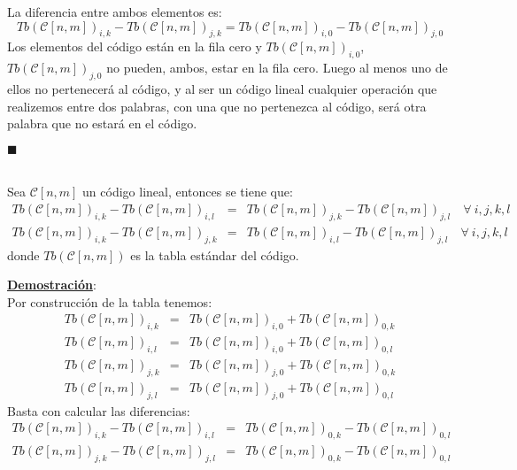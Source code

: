 La diferencia entre ambos elementos es:
\begin{displaymath}
Tb(\mathcal{C}[n,m])_{i,k}-Tb(\mathcal{C}[n,m])_{j,k}=
Tb(\mathcal{C}[n,m])_{i,0}-Tb(\mathcal{C}[n,m])_{j,0}
\end{displaymath}
Los elementos del c\'odigo est\'an en la fila cero y
$Tb(\mathcal{C}[n,m])_{i,0}$, $Tb(\mathcal{C}[n,m])_{j,0}$ no pueden, ambos,
estar en la fila cero. Luego al menos uno de ellos no pertenecer\'a al c\'odigo,
y al ser un c\'odigo lineal cualquier operaci\'on que realizemos entre dos
palabras, con una que no pertenezca al c\'odigo, ser\'a otra palabra que no
estar\'a en el c\'odigo.
\begin{flushright}
$\blacksquare$
\end{flushright}
%
%
\begin{proposicion}\label{pro:Propiedades}
\ \\
Sea $\mathcal{C}[n,m]$ un c\'odigo lineal, entonces se tiene que:
\begin{eqnarray*}
Tb(\mathcal{C}[n,m])_{i,k}-Tb(\mathcal{C}[n,m])_{i,l}&=&
Tb(\mathcal{C}[n,m])_{j,k}-Tb(\mathcal{C}[n,m])_{j,l}\quad \forall \ i,j,k,l\\
Tb(\mathcal{C}[n,m])_{i,k}-Tb(\mathcal{C}[n,m])_{j,k}&=&
Tb(\mathcal{C}[n,m])_{i,l}-Tb(\mathcal{C}[n,m])_{j,l}\quad \forall \ i,j,k,l
\end{eqnarray*}
donde $Tb(\mathcal{C}[n,m])$ es la tabla est\'andar del c\'odigo.
\end{proposicion}
\underline{\textbf{Demostraci\'on}}:\\
Por construcci\'on de la tabla tenemos:
\begin{eqnarray*}
Tb(\mathcal{C}[n,m])_{i,k}&=& Tb(\mathcal{C}[n,m])_{i,0}+
Tb(\mathcal{C}[n,m])_{0,k}\\
Tb(\mathcal{C}[n,m])_{i,l}&=& Tb(\mathcal{C}[n,m])_{i,0}+
Tb(\mathcal{C}[n,m])_{0,l}\\
Tb(\mathcal{C}[n,m])_{j,k}&=& Tb(\mathcal{C}[n,m])_{j,0}+
Tb(\mathcal{C}[n,m])_{0,k}\\
Tb(\mathcal{C}[n,m])_{j,l}&=& Tb(\mathcal{C}[n,m])_{j,0}+
Tb(\mathcal{C}[n,m])_{0,l}
\end{eqnarray*}
Basta con calcular las diferencias:
\begin{eqnarray*}
Tb(\mathcal{C}[n,m])_{i,k}-Tb(\mathcal{C}[n,m])_{i,l}&=&
Tb(\mathcal{C}[n,m])_{0,k}-Tb(\mathcal{C}[n,m])_{0,l}\\
Tb(\mathcal{C}[n,m])_{j,k}-Tb(\mathcal{C}[n,m])_{j,l}&=&
Tb(\mathcal{C}[n,m])_{0,k}-Tb(\mathcal{C}[n,m])_{0,l}
\end{eqnarray*}
